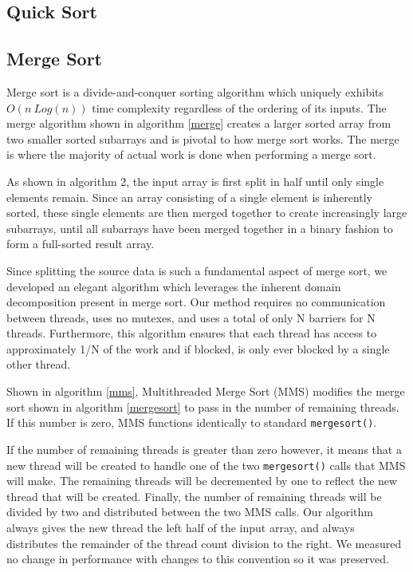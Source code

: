 \documentclass[journal]{IEEEtran}
\begin{document}
\subsection{Quick Sort}

\subsection{Merge Sort}
Merge sort is a divide-and-conquer sorting algorithm which uniquely exhibits $O(n\ Log(n))$ time complexity regardless of the ordering of its inputs.  The merge algorithm shown in algorithm \ref{merge} creates a larger sorted array from two smaller sorted subarrays and is pivotal to how merge sort works.  The merge is where the majority of actual work is done when performing a merge sort.   

As shown in algorithm 2, the input array is first split in half until only single elements remain.  Since an array consisting of a single element is inherently sorted, these single elements are then merged together to create increasingly large subarrays, until all subarrays have been merged together in a binary fashion to form a full-sorted result array.

Since splitting the source data is such a fundamental aspect of merge sort, we developed an elegant algorithm which leverages the inherent domain decomposition present in merge sort.  Our method requires no communication between threads, uses no mutexes, and uses a total of only N barriers for N threads.  Furthermore, this algorithm ensures that each thread has access to approximately 1/N of the work and if blocked, is only ever blocked by a single other thread.  

Shown in algorithm \ref{mms}, Multithreaded Merge Sort (MMS) modifies the merge sort shown in algorithm \ref{mergesort} to pass in the number of remaining threads.  If this number is zero, MMS functions identically to standard \texttt{mergesort()}. 

If the number of remaining threads is greater than zero however, it means that a new thread will be created to handle one of the two \texttt{mergesort()} calls that MMS will make.  The remaining threads will be decremented by one to reflect the new thread that will be created.  Finally, the number of remaining threads will be divided by two and distributed between the two MMS calls.  Our algorithm always gives the new thread the left half of the input array, and always distributes the remainder of the thread count division to the right.  We measured no change in performance with changes to this convention so it was preserved.  
\end{document}
